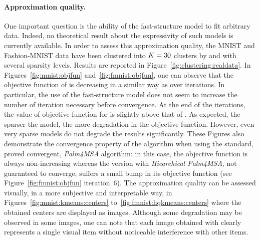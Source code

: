 
\paragraph{Approximation quality.} One important question is the ability of the fast-structure model to fit arbitrary data.
Indeed, no theoretical result about the expressivity of such models is currently available.
In order to assess this approximation quality, the MNIST and Fashion-MNIST data have been clustered into $K=30$ clusters by \kmeans and \qkmeans with several sparsity levels.
Results are reported in Figure~\ref{fig:clustering:realdata}.
In Figures~\ref{fig:mnist:objfun} and~\ref{fig:fmnist:objfun}, one can observe that the objective function of \qkmeans is decreasing in a similar way as \kmeans over iterations.
In particular, the use of the fast-structure model does not seem to increase the number of iteration necessary before convergence.
At the end of the iterations, the value of objective function for \qkmeans is slightly above that of \kmeans.
As expected, the sparser the model, the more degradation in the objective function.
However, even very sparse models do not degrade the results significantly. These Figures also demonstrate the convergence property of the \qkmeans algorithm when using the standard, proved convergent, \textit{Palm4MSA} algorithm: in this case, the objective function is always non-increasing whereas the \qkmeans version with \textit{Hiearchical Palm4MSA}, not guaranteed to converge, suffers a small bump in its objective function (see Figure~\ref{fig:fmnist:objfun} iteration~6).
The approximation quality can be assessed visually, in a more subjective and interpretable way, in Figures~\ref{fig:mnist:kmeans:centers} to~\ref{fig:fmnist:hqkmeans:centers} where the obtained centers are displayed as images.
Although some degradation may be observed in some images, one can note that each image obtained with \qkmeans clearly represents a single visual item without noticeable interference with other items.

